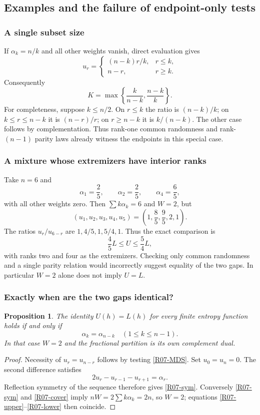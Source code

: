 \documentclass[11pt,a4paper]{article}
\newtheorem{proposition}[theorem]{Proposition}
\theoremstyle{definition}\newtheorem{definition}[theorem]{Definition}
\theoremstyle{remark}\newtheorem{remark}[theorem]{Remark}
\numberwithin{equation}{section}
\begin{document}
\subsection{Examples and the failure of endpoint-only tests}\label{R07-sec-4}
\subsubsection{A single subset size}
If $\alpha_k=n/k$ and all other weights vanish, direct evaluation gives
\[
 u_r=\begin{cases}(n-k)r/k,&r\le k,\\n-r,&r\ge k.\end{cases}
\]
Consequently
\begin{equation}\label{R07-pure}
 K=\max\left\{\frac{k}{n-k},\frac{n-k}{k}\right\}.
\end{equation}
For completeness, suppose $k\le n/2$. On $r\le k$ the ratio is $(n-k)/k$; on $k\le r\le n-k$ it is $(n-r)/r$; on $r\ge n-k$ it is $k/(n-k)$. The other case follows by complementation. Thus rank-one common randomness and rank-$(n-1)$ parity laws already witness the endpoints in this special case.

\subsubsection{A mixture whose extremizers have interior ranks}
Take $n=6$ and
\[
 \alpha_1=\frac25,\qquad \alpha_2=\frac25,\qquad \alpha_4=\frac65,
\]
with all other weights zero. Then $\sum k\alpha_k=6$ and $W=2$, but
\[
 (u_1,u_2,u_3,u_4,u_5)=\left(1,\frac85,\frac95,2,1\right).
\]
The ratios $u_r/u_{6-r}$ are $1,4/5,1,5/4,1$. Thus the exact comparison is
\[
 \frac45 L\le U\le\frac54L,
\]
with ranks two and four as the extremizers. Checking only common randomness and a single parity relation would incorrectly suggest equality of the two gaps. In particular $W=2$ alone does not imply $U=L$.

\subsubsection{Exactly when are the two gaps identical?}
\begin{proposition}\label{R07-selfdual}
The identity $U(h)=L(h)$ for every finite entropy function holds if and only if
\begin{equation}\label{R07-sym}\alpha_k=\alpha_{n-k}\quad(1\le k\le n-1).\end{equation}
In that case $W=2$ and the fractional partition is its own complement dual.
\end{proposition}
\begin{proof}
Necessity of $u_r=u_{n-r}$ follows by testing \eqref{R07-MDS}. Set $u_0=u_n=0$. The second difference satisfies
\[
 2u_r-u_{r-1}-u_{r+1}=\alpha_r.
\]
Reflection symmetry of the sequence therefore gives \eqref{R07-sym}. Conversely \eqref{R07-sym} and \eqref{R07-cover} imply $nW=2\sum k\alpha_k=2n$, so $W=2$; equations \eqref{R07-upper}--\eqref{R07-lower} then coincide.
\end{proof}
\end{document}
